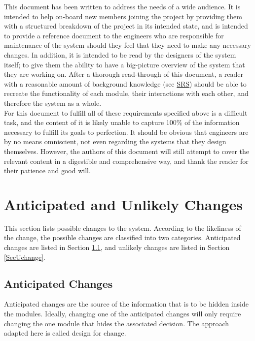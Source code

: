 \documentclass[12pt, titlepage]{article}
\begin{document}
This document has been written to address the needs of a wide audience. It is intended to help on-board new members joining the project by providing them with a structured breakdown of the project in its intended state, and is intended to provide a reference document to the engineers who are responsible for maintenance of the system should they feel that they need to make any necessary changes. In addition, it is intended to be read by the designers of the system itself; to give them the ability to have a big-picture overview of the system that they are working on. After a thorough read-through of this document, a reader with a reasonable amount of background knowledge (see \href{https://github.com/zakerl/Capstone_Project/blob/main/docs/Design/SystDesign/SystDes.pdf}{SRS}) should be able to recreate the functionality of each module, their interactions with each other, and therefore the system as a whole.\\

For this document to fulfill all of these requirements specified above is a difficult task, and the content of it is likely unable to capture 100\% of the information necessary to fulfill its goals to perfection. It should be obvious that engineers are by no means omniscient, not even regarding the systems that they design themselves. However, the authors of this document will still attempt to cover the relevant content in a digestible and comprehensive way, and thank the reader for their patience and good will.\\

\newpage

\section{Anticipated and Unlikely Changes} \label{SecChange}

This section lists possible changes to the system. According to the likeliness
of the change, the possible changes are classified into two
categories. Anticipated changes are listed in Section \ref{SecAchange}, and
unlikely changes are listed in Section \ref{SecUchange}.

\subsection{Anticipated Changes} \label{SecAchange}

Anticipated changes are the source of the information that is to be hidden
inside the modules. Ideally, changing one of the anticipated changes will only
require changing the one module that hides the associated decision. The approach
adapted here is called design for
change.
\end{document}

